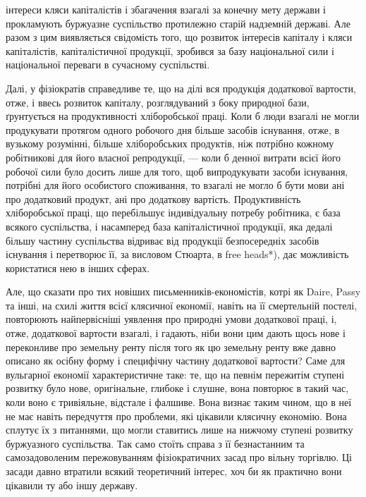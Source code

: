 інтереси кляси капіталістів і збагачення взагалі за конечну мету держави і прокламують
буржуазне суспільство протилежно старій надземній державі. Але разом
з цим виявляється свідомість того, що розвиток інтересів капіталу і кляси капіталістів,
капіталістичної продукції, зробився за базу національної сили і національної
переваги в сучасному суспільстві.

Далі, у фізіократів справедливе те, що на ділі вся продукція додаткової вартости,
отже, і ввесь розвиток капіталу, розглядуваний з боку природної бази,
ґрунтується на продуктивності хліборобської праці. Коли б люди взагалі не могли
продукувати протягом одного робочого дня більше засобів існування, отже, в вузькому
розумінні, більше хліборобських продуктів, ніж потрібно кожному робітникові
для його власної репродукції, — коли б денної витрати всієї його робочої сили
було досить лише для того, щоб випродукувати засоби існування, потрібні для
його особистого споживання, то взагалі не могло б бути мови ані про додатковий
продукт, ані про додаткову вартість. Продуктивність хліборобської праці, що
перебільшує індивідуальну потребу робітника, є база всякого суспільства, і насамперед
база капіталістичної продукції, яка дедалі більшу частину суспільства
відриває від продукції безпосередніх засобів існування і перетворює її, за висловом
Стюарта, в free heads*), дає можливість користатися нею в інших сферах.

Але, що сказати про тих новіших письменників-економістів, котрі як
Daire, Passy та інші, на схилі життя всієї клясичної економії, навіть на її смертельній
постелі, повторюють найпервісніші уявлення про природні умови додаткової
праці, і, отже, додаткової вартости взагалі, і гадають, ніби вони цим дають
щось нове і переконливе про земельну ренту після того як цю земельну ренту
вже давно описано як осібну форму і специфічну частину додаткової вартости?
Саме для вульгарної економії характеристичне таке: те, що на певнім пережитім ступені
розвитку було нове, оригінальне, глибоке і слушне, вона повторює в
такий час, коли воно є тривіяльне, відстале і фалшиве. Вона визнає таким
чином, що в неї не має навіть передчуття про проблеми, які цікавили клясичну
економію. Вона сплутує їх з питаннями, що могли ставитись лише на нижчому
ступені розвитку буржуазного суспільства. Так само стоїть справа з її безнастанним
та самозадоволеним пережовуванням фізіократичних засад про вільну
торгівлю. Ці засади давно втратили всякий теоретичний інтерес, хоч би як
практично вони цікавили ту або іншу державу.

